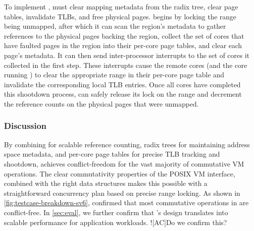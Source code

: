 To implement , \vm must clear mapping metadata from the
radix tree, clear page tables, invalidate TLBs, and free physical
pages.   begins by locking the range being unmapped,
after which it can scan the region's metadata to gather references to
the physical pages backing the region, collect the set of cores that
have faulted pages in the region into their per-core page tables, and
clear each page's metadata.  It can then send inter-processor
interrupts to the set of cores it collected in the first step.  These
interrupts cause the remote cores (and the core running )
to clear the appropriate range in their per-core page table and
invalidate the corresponding local TLB entries.  Once all cores have
completed this shootdown process,  can safely release its
lock on the range and decrement the reference counts on the physical
pages that were unmapped.


\subsubsection{Discussion}

By combining  for scalable reference counting, radix trees
for maintaining address space metadata, and per-core page tables for
precise TLB tracking and shootdown, \vm achieves conflict-freedom for
the vast majority of commutative VM operations.  The clear
commutativity properties of the POSIX VM interface, combined with the
right data structures makes this possible with a straightforward
concurrency plan based on precise range locking.
%
As shown in \cref{fig:testcase-breakdown-sv6}, \tool confirmed that
most commutative operations in \vm are conflict-free.  In
\cref{sec:eval}, we further confirm that \vm's design translates into
scalable performance for application workloads. \XXX![AC]{Do we
  confirm this?}

